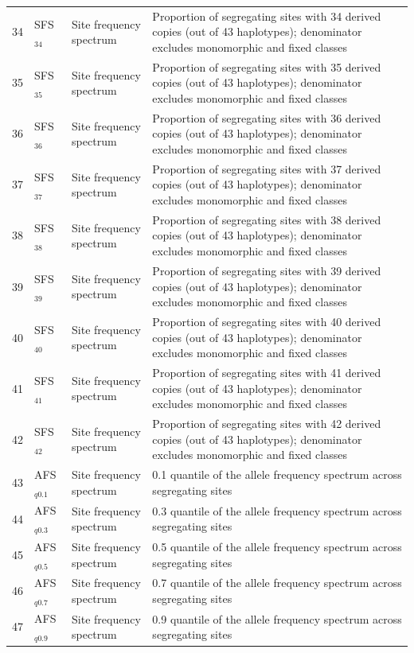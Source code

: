 \begin{longtable}{@{}rllp{7.5cm}@{}}
34 & SFS$_{34}$ & Site frequency spectrum & Proportion of segregating sites with 34 derived copies (out of 43 haplotypes); denominator excludes monomorphic and fixed classes \\
35 & SFS$_{35}$ & Site frequency spectrum & Proportion of segregating sites with 35 derived copies (out of 43 haplotypes); denominator excludes monomorphic and fixed classes \\
36 & SFS$_{36}$ & Site frequency spectrum & Proportion of segregating sites with 36 derived copies (out of 43 haplotypes); denominator excludes monomorphic and fixed classes \\
37 & SFS$_{37}$ & Site frequency spectrum & Proportion of segregating sites with 37 derived copies (out of 43 haplotypes); denominator excludes monomorphic and fixed classes \\
38 & SFS$_{38}$ & Site frequency spectrum & Proportion of segregating sites with 38 derived copies (out of 43 haplotypes); denominator excludes monomorphic and fixed classes \\
39 & SFS$_{39}$ & Site frequency spectrum & Proportion of segregating sites with 39 derived copies (out of 43 haplotypes); denominator excludes monomorphic and fixed classes \\
40 & SFS$_{40}$ & Site frequency spectrum & Proportion of segregating sites with 40 derived copies (out of 43 haplotypes); denominator excludes monomorphic and fixed classes \\
41 & SFS$_{41}$ & Site frequency spectrum & Proportion of segregating sites with 41 derived copies (out of 43 haplotypes); denominator excludes monomorphic and fixed classes \\
42 & SFS$_{42}$ & Site frequency spectrum & Proportion of segregating sites with 42 derived copies (out of 43 haplotypes); denominator excludes monomorphic and fixed classes \\
43 & AFS$_{q0.1}$ & Site frequency spectrum & 0.1 quantile of the allele frequency spectrum across segregating sites \\
44 & AFS$_{q0.3}$ & Site frequency spectrum & 0.3 quantile of the allele frequency spectrum across segregating sites \\
45 & AFS$_{q0.5}$ & Site frequency spectrum & 0.5 quantile of the allele frequency spectrum across segregating sites \\
46 & AFS$_{q0.7}$ & Site frequency spectrum & 0.7 quantile of the allele frequency spectrum across segregating sites \\
47 & AFS$_{q0.9}$ & Site frequency spectrum & 0.9 quantile of the allele frequency spectrum across segregating sites \\

\end{longtable}
